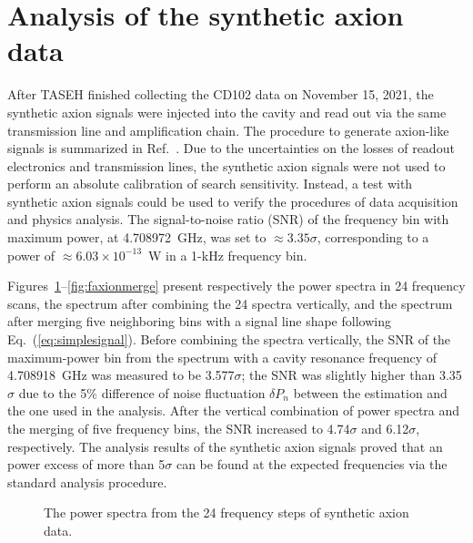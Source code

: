\section{Analysis of the synthetic axion data}
After TASEH finished collecting the CD102 data on November 15, 2021, 
the synthetic axion signals were injected into the cavity and read out via the 
same transmission line and amplification chain. The procedure 
to generate axion-like signals is summarized in Ref.~\cite{TASEHInstrumentation}. 
Due to the uncertainties on the losses of readout electronics and transmission lines,  
the synthetic axion signals were not used to perform an absolute calibration of 
search sensitivity. Instead, 
a test with synthetic axion signals could be used to verify the procedures of 
data acquisition and physics analysis. The 
signal-to-noise ratio (SNR) of the frequency bin with maximum power, at 
4.708972~GHz, was set to $\approx 3.35\sigma$, corresponding to 
a power of $\approx 6.03 \times 10^{-13}$~W in a 1-kHz frequency bin.  

Figures~\ref{fig:faxionstep}--\ref{fig:faxionmerge} present respectively the power spectra in 
24 frequency scans, the spectrum after combining the 24 spectra vertically, and the spectrum 
after merging five neighboring bins with a signal line shape following 
Eq.~(\ref{eq:simplesignal}). Before combining the spectra vertically, 
the SNR of the maximum-power bin from the spectrum with a cavity resonance frequency of 
4.708918~GHz was measured to be 3.577$\sigma$; the SNR was slightly higher than 
3.35$\sigma$ due to the 5\% difference of noise fluctuation $\delta P_n$ between 
the estimation and the one used in the analysis. After the vertical combination 
of power spectra and the merging of five frequency bins, the SNR increased to 
4.74$\sigma$ and 6.12$\sigma$, respectively. 
The analysis results of the synthetic axion signals proved that an power excess 
of more than 5$\sigma$ can be found at the expected frequencies via the standard 
analysis procedure.  

\begin{figure}[htbp]                                                                                                  
    \centering                                                                                                                       
    \caption{The power spectra from the 24 frequency steps of synthetic axion data.}                
\label{fig:faxionstep}                                                                                                            
\end{figure}                       

